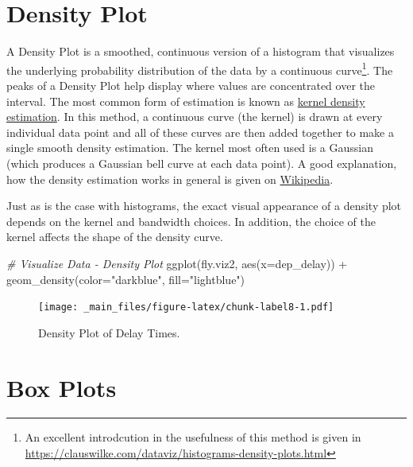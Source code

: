 \documentclass[
]{book}
\newenvironment{Shaded}{\begin{snugshade}}{\end{snugshade}}
\newcommand{\AttributeTok}[1]{\textcolor[rgb]{0.77,0.63,0.00}{#1}}
\newcommand{\CommentTok}[1]{\textcolor[rgb]{0.56,0.35,0.01}{\textit{#1}}}
\newcommand{\FunctionTok}[1]{\textcolor[rgb]{0.00,0.00,0.00}{#1}}
\newcommand{\NormalTok}[1]{#1}
\newcommand{\SpecialCharTok}[1]{\textcolor[rgb]{0.00,0.00,0.00}{#1}}
\newcommand{\StringTok}[1]{\textcolor[rgb]{0.31,0.60,0.02}{#1}}
\begin{document}
\hypertarget{density-plot}{%
\section{Density Plot}\label{density-plot}}

A Density Plot is a smoothed, continuous version of a histogram that visualizes the underlying probability distribution of the data by a continuous curve\footnote{An excellent introdcution in the usefulness of this method is given in \url{https://clauswilke.com/dataviz/histograms-density-plots.html}}. The peaks of a Density Plot help display where values are concentrated over the interval. The most common form of estimation is known as \href{https://en.wikipedia.org/wiki/Kernel_density_estimation}{kernel density estimation}. In this method, a continuous curve (the kernel) is drawn at every individual data point and all of these curves are then added together to make a single smooth density estimation. The kernel most often used is a Gaussian (which produces a Gaussian bell curve at each data point). A good explanation, how the density estimation works in general is given on \href{https://en.wikipedia.org/wiki/Kernel_density_estimation\#Example}{Wikipedia}.

Just as is the case with histograms, the exact visual appearance of a density plot depends on the kernel and bandwidth choices. In addition, the choice of the kernel affects the shape of the density curve.

\begin{Shaded}
\begin{Highlighting}[]
\CommentTok{\# Visualize Data {-} Density Plot}
\FunctionTok{ggplot}\NormalTok{(fly.viz2, }\FunctionTok{aes}\NormalTok{(}\AttributeTok{x=}\NormalTok{dep\_delay)) }\SpecialCharTok{+} \FunctionTok{geom\_density}\NormalTok{(}\AttributeTok{color=}\StringTok{"darkblue"}\NormalTok{, }\AttributeTok{fill=}\StringTok{"lightblue"}\NormalTok{)}
\end{Highlighting}
\end{Shaded}

\begin{figure}
\centering
\texttt{[image: \_main\_files/figure-latex/chunk-label8-1.pdf]}
\caption{\label{fig:chunk-label8}Density Plot of Delay Times.}
\end{figure}

\hypertarget{box-plots}{%
\section{Box Plots}\label{box-plots}}
\end{document}
